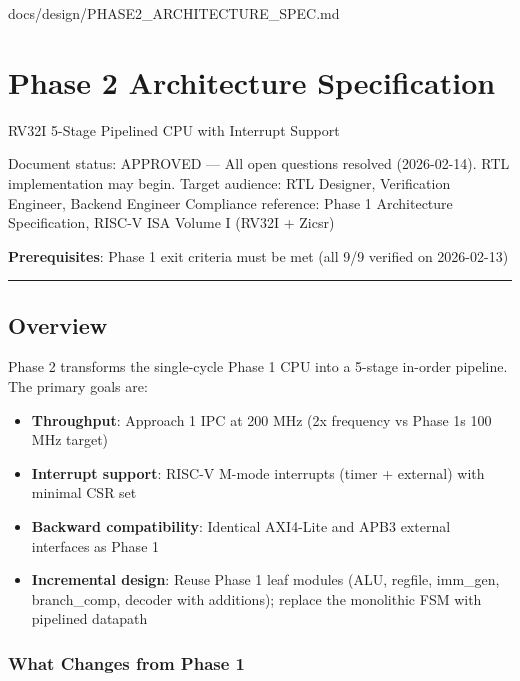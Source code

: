 \begin{relocated}{docs/design/PHASE2_ARCHITECTURE_SPEC.md}
\section{Phase 2 Architecture Specification}\label{ds:ch:phase2-architecture}

RV32I 5-Stage Pipelined CPU with Interrupt Support

Document status: APPROVED --- All open questions resolved (2026-02-14).
RTL implementation may begin. Target audience: RTL Designer,
Verification Engineer, Backend Engineer Compliance reference: Phase 1
Architecture Specification, RISC-V ISA Volume I (RV32I + Zicsr)

\textbf{Prerequisites}: Phase 1 exit criteria must be met (all 9/9
verified on 2026-02-13)

\begin{center}\rule{0.5\linewidth}{0.5pt}\end{center}

\subsection{Overview}\label{ds:ch:phase2-architecture:1-overview}

Phase 2 transforms the single-cycle Phase 1 CPU into a 5-stage in-order
pipeline. The primary goals are:

\begin{itemize}
\tightlist
\item
  \textbf{Throughput}: Approach 1 IPC at 200 MHz (2x frequency vs Phase
  1\textquotesingle s 100 MHz target)
\item
  \textbf{Interrupt support}: RISC-V M-mode interrupts (timer +
  external) with minimal CSR set
\item
  \textbf{Backward compatibility}: Identical AXI4-Lite and APB3 external
  interfaces as Phase 1
\item
  \textbf{Incremental design}: Reuse Phase 1 leaf modules (ALU, regfile,
  imm\_gen, branch\_\allowbreak{}comp, decoder with additions); replace
  the monolithic FSM with pipelined datapath
\end{itemize}

\subsubsection{What Changes from Phase 1}\label{ds:ch:phase2-architecture:11-what-changes-from-phase-1}


\end{relocated}
